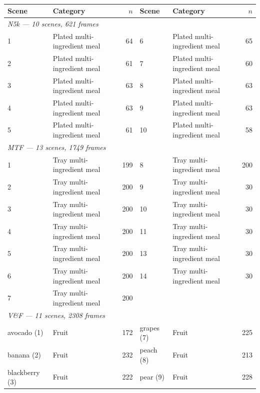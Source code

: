 \begin{table}[htb]
\centering
\footnotesize
\caption{}
\label{tab:scene_inventory}
\begin{tabular}{llr@{\hskip 2em}llr}
\toprule
\textbf{Scene} & \textbf{Category} & \textbf{$n$} & \textbf{Scene} & \textbf{Category} & \textbf{$n$} \\
\midrule
\multicolumn{6}{l}{\textit{N5k --- 10 scenes, 621 frames}} \\
1 & Plated multi-ingredient meal & 64 & 6 & Plated multi-ingredient meal & 65 \\
2 & Plated multi-ingredient meal & 61 & 7 & Plated multi-ingredient meal & 60 \\
3 & Plated multi-ingredient meal & 63 & 8 & Plated multi-ingredient meal & 63 \\
4 & Plated multi-ingredient meal & 63 & 9 & Plated multi-ingredient meal & 63 \\
5 & Plated multi-ingredient meal & 61 & 10 & Plated multi-ingredient meal & 58 \\
\midrule
\multicolumn{6}{l}{\textit{MTF --- 13 scenes, 1749 frames}} \\
1 & Tray multi-ingredient meal & 199 & 8 & Tray multi-ingredient meal & 200 \\
2 & Tray multi-ingredient meal & 200 & 9 & Tray multi-ingredient meal & 30 \\
3 & Tray multi-ingredient meal & 200 & 10 & Tray multi-ingredient meal & 30 \\
4 & Tray multi-ingredient meal & 200 & 11 & Tray multi-ingredient meal & 30 \\
5 & Tray multi-ingredient meal & 200 & 13 & Tray multi-ingredient meal & 30 \\
6 & Tray multi-ingredient meal & 200 & 14 & Tray multi-ingredient meal & 30 \\
7 & Tray multi-ingredient meal & 200 &  &  &  \\
\midrule
\multicolumn{6}{l}{\textit{V\&F --- 11 scenes, 2308 frames}} \\
avocado (1) & Fruit & 172 & grapes (7) & Fruit & 225 \\
banana (2) & Fruit & 232 & peach (8) & Fruit & 213 \\
blackberry (3) & Fruit & 222 & pear (9) & Fruit & 228 \\

\end{tabular}
\end{table}
